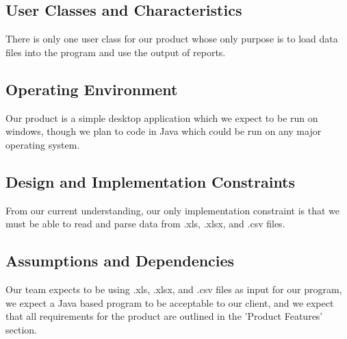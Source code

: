\subsection{User Classes and Characteristics}
There is only one user class for our product whose only purpose is to load data files into the program and use the output of reports. 

\subsection{Operating Environment}
Our product is a simple desktop application which we expect to be run on windows, though we plan to code in Java which could be run on any major operating system. 

\subsection{Design and Implementation Constraints}
From our current understanding, our only implementation constraint is that we must be able to read and parse data from .xls, .xlsx, and .csv files. 

\subsection{Assumptions and Dependencies}
Our team expects to be using .xls, .xlsx, and .csv files as input for our program, we expect a Java based program to be acceptable to our client, and we expect that all requirements for the product are outlined in the 'Product Features' section.

